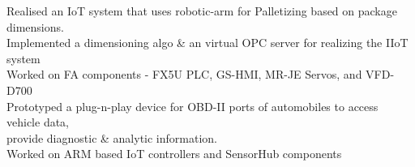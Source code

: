\documentclass[]{deedy-resume-openfont}
\begin{document}
\begin{minipage}[t]{0.66\textwidth}


\vspace{2mm}
\small {
\hspace{2mm}  \textbullet{} Realised an IoT system that uses robotic-arm for Palletizing based on package dimensions.\\
\hspace{2mm}  \textbullet{} Implemented a dimensioning algo \& an virtual OPC server for realizing the IIoT system\\
\hspace{2mm}  \textbullet{} Worked on FA components - FX5U PLC, GS-HMI, MR-JE Servos, and VFD-D700\\
}
\vspace{2mm}
\small {
\hspace{2mm}  \textbullet{} Prototyped a plug-n-play device for OBD-II ports of automobiles to access vehicle data,\\
\hspace{5mm} provide diagnostic \& analytic information.\\
\hspace{2mm}  \textbullet{} Worked on ARM based IoT controllers and SensorHub components\\
}


\end{minipage}
\end{document}
